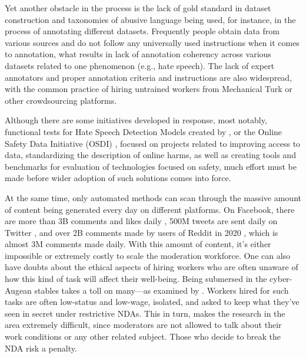 \documentclass[preprint,12pt]{elsarticle}
\begin{document}
Yet another obstacle in the process is the lack of gold standard in dataset construction and taxonomies of abusive language being used, for instance, in the process of annotating different datasets. Frequently people obtain data from various sources and do not follow any universally used instructions when it comes to annotation, what results in lack of annotation coherency across various datasets related to one phenomenon (e.g., hate speech). The lack of expert annotators and proper annotation criteria and instructions are also widespread, with the common practice of hiring untrained workers from Mechanical Turk or other crowdsourcing platforms.

Although there are some initiatives developed in response, most notably, functional tests for Hate Speech Detection Models created by \citet{rottger2020hatecheck}, or the Online Safety Data Initiative (OSDI) \citep{onlinesafetydata}, focused on projects related to improving access to data, standardizing the description of online harms, as well as creating tools and benchmarks for evaluation of technologies focused on safety, much effort must be made before wider adoption of such solutions comes into force.

At the same time, only automated methods can scan through the massive amount of content being generated every day on different platforms. On Facebook, there are more than 3B comments and likes daily \citep{noauthor_facebook:_2012}, 500M tweets are sent daily on Twitter \citep{noauthor_10_2021}, and over 2B comments made by users of Reddit in 2020 \citep{noauthor_reddit_nodate}, which is almost 3M comments made daily. With this amount of content, it’s either impossible or extremely costly to scale the moderation workforce. One can also have doubts about the ethical aspects of hiring workers who are often unaware of how this kind of task will affect their well-being. Being submersed in the cyber-Augean stables takes a toll on many---as examined by \citet{roberts2014behind, roberts2016commercial}. Workers hired for such tasks are often low-status and low-wage, isolated, and asked to keep what they’ve seen in secret under restrictive NDAs. This in turn, makes the research in the area extremely difficult, since moderators are not allowed to talk about their work conditions or any other related subject. Those who decide to break the NDA risk a penalty.
\end{document}
